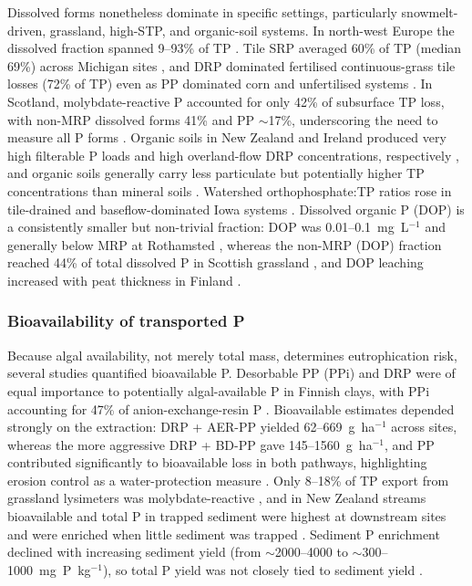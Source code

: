 \documentclass[11pt]{article}
\begin{document}
Dissolved forms nonetheless dominate in specific settings, particularly
snowmelt-driven, grassland, high-STP, and organic-soil systems. In north-west
Europe the dissolved fraction spanned 9--93\% of TP \parencite{Ulén2007}. Tile SRP
averaged 60\% of TP (median 69\%) across Michigan sites \parencite{Clement2017}, and
DRP dominated fertilised continuous-grass tile losses (72\% of TP) even as PP
dominated corn and unfertilised systems \parencite{Zhang2015b}. In Scotland,
molybdate-reactive P accounted for only 42\% of subsurface TP loss, with non-MRP
dissolved forms 41\% and PP $\sim$17\%, underscoring the need to measure all P forms
\parencite{Hooda1999}. Organic soils in New Zealand and Ireland produced very high
filterable P loads and high overland-flow DRP concentrations, respectively
\parencite{McDowell2015b,Kurz2005}, and organic soils generally carry less
particulate but potentially higher TP concentrations than mineral soils
\parencite{Grenon2021}. Watershed orthophosphate:TP ratios rose in tile-drained and
baseflow-dominated Iowa systems \parencite{Schilling2017b}. Dissolved organic P
(DOP) is a consistently smaller but non-trivial fraction: DOP was 0.01--0.1~mg~L$^{-1}$
and generally below MRP at Rothamsted \parencite{Lu2003,Lu2004}, whereas the non-MRP
(DOP) fraction reached 44\% of total dissolved P in Scottish grassland
\parencite{Hooda1999}, and DOP leaching increased with peat thickness in Finland
\parencite{YliHalla2022}.

\subsubsection{Bioavailability of transported P}

Because algal availability, not merely total mass, determines eutrophication risk,
several studies quantified bioavailable P. Desorbable PP (PPi) and DRP were of equal
importance to potentially algal-available P in Finnish clays, with PPi accounting for
47\% of anion-exchange-resin P \parencite{Uusitalo2001}. Bioavailable estimates
depended strongly on the extraction: DRP + AER-PP yielded 62--669~g~ha$^{-1}$ across
sites, whereas the more aggressive DRP + BD-PP gave 145--1560~g~ha$^{-1}$, and PP
contributed significantly to bioavailable loss in both pathways, highlighting erosion
control as a water-protection measure \parencite{Uusitalo2003}. Only 8--18\% of TP
export from grassland lysimeters was molybdate-reactive \parencite{Bilotta2008}, and
in New Zealand streams bioavailable and total P in trapped sediment were highest at
downstream sites and were enriched when little sediment was trapped
\parencite{McDowell2004}. Sediment P enrichment declined with increasing sediment
yield (from $\sim$2000--4000 to $\sim$300--1000~mg~P~kg$^{-1}$), so total P yield was
not closely tied to sediment yield \parencite{Gillingham2000}.
\end{document}
